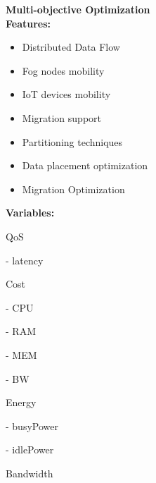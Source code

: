 \documentclass{article}
\begin{document}
\newcommand{\SubItem}[1]{
    {\setlength\itemindent{15pt} \item[-] #1}
}

\noindent\textbf{Multi-objective Optimization}\\[12pt]

\noindent\textbf{Features:}\\[6pt]
\begin{itemize}
\item Distributed Data Flow
\item Fog nodes mobility
\item IoT devices mobility
\item Migration support
\item Partitioning techniques
\item Data placement optimization
\item Migration Optimization
\end{itemize}

\noindent\textbf{Variables:}\\[6pt]
\begin{itemize}
\item QoS
\SubItem{latency}
\item Cost
\SubItem{CPU}
\SubItem{RAM}
\SubItem{MEM}
\SubItem{BW}
\item Energy
\SubItem{busyPower}
\SubItem{idlePower}
\item Bandwidth
\end{itemize}
\end{document}
